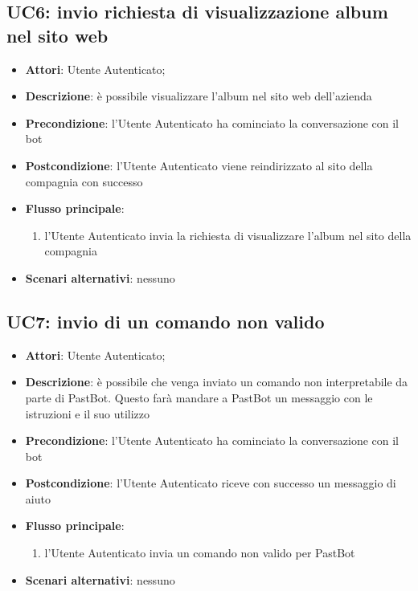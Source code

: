 
\subsection{UC6: invio richiesta di visualizzazione album nel sito web}
\label{uc:uc6}

\begin{itemize}
  \item \textbf{Attori}: Utente Autenticato;
  \item \textbf{Descrizione}: è possibile visualizzare l'album nel sito web
dell'azienda
  \item \textbf{Precondizione}: l'Utente Autenticato ha cominciato la
conversazione con il bot
  \item \textbf{Postcondizione}: l'Utente Autenticato viene reindirizzato al
sito della compagnia con successo
  \item \textbf{Flusso principale}:
  \begin{enumerate}
    \item l'Utente Autenticato invia la richiesta di visualizzare l'album nel
sito della compagnia
  \end{enumerate}
  \item \textbf{Scenari alternativi}: nessuno
\end{itemize}


\subsection{UC7: invio di un comando non valido}
\label{uc:uc7}

\begin{itemize}
  \item \textbf{Attori}: Utente Autenticato;
  \item \textbf{Descrizione}: è possibile che venga inviato un comando non
interpretabile da parte di PastBot. Questo farà mandare a PastBot un messaggio
con le istruzioni e il suo utilizzo
  \item \textbf{Precondizione}: l'Utente Autenticato ha cominciato la
conversazione con il bot
  \item \textbf{Postcondizione}: l'Utente Autenticato riceve con successo un
messaggio di aiuto
  \item \textbf{Flusso principale}:
  \begin{enumerate}
    \item l'Utente Autenticato invia un comando non valido per PastBot
  \end{enumerate}
  \item \textbf{Scenari alternativi}: nessuno
\end{itemize}


